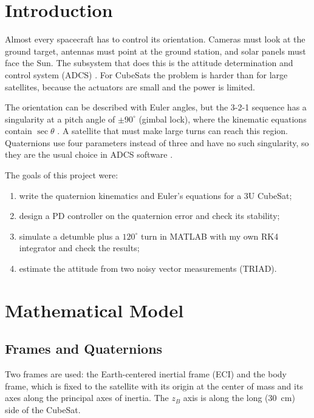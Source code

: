 \documentclass[letterpaper,10pt]{article}
\begin{document}
\section{Introduction}

Almost every spacecraft has to control its orientation. Cameras must look at
the ground target, antennas must point at the ground station, and solar
panels must face the Sun. The subsystem that does this is the attitude
determination and control system (ADCS) \cite{wertz,wie}. For CubeSats the
problem is harder than for large satellites, because the actuators are small
and the power is limited.

The orientation can be described with Euler angles, but the 3-2-1 sequence
has a singularity at a pitch angle of $\pm90^\circ$ (gimbal lock), where the
kinematic equations contain $\sec\theta$ \cite{shuster}. A satellite that
must make large turns can reach this region. Quaternions use four parameters
instead of three and have no such singularity, so they are the usual choice
in ADCS software \cite{markley,wie_barba}.

The goals of this project were:
\begin{enumerate}[leftmargin=2.2em,itemsep=0pt]
  \item write the quaternion kinematics and Euler's equations for a 3U CubeSat;
  \item design a PD controller on the quaternion error and check its stability;
  \item simulate a detumble plus a $120^\circ$ turn in MATLAB with my own RK4
        integrator and check the results;
  \item estimate the attitude from two noisy vector measurements (TRIAD).
\end{enumerate}

\section{Mathematical Model}

\subsection{Frames and Quaternions}

Two frames are used: the Earth-centered inertial frame (ECI) and the body
frame, which is fixed to the satellite with its origin at the center of mass
and its axes along the principal axes of inertia. The $z_B$ axis is along the
long (30~cm) side of the CubeSat.
\end{document}
